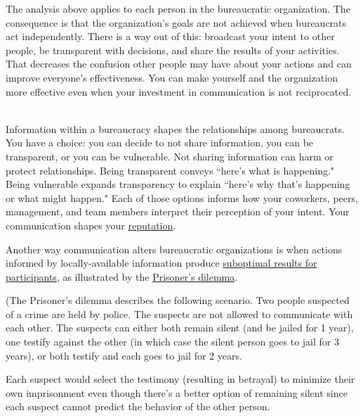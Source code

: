 The analysis above applies to each person in the bureaucratic organization.
The consequence is that the organization's goals are not achieved when bureaucrats act independently. 
There is a way out of this: broadcast your intent to other people, be transparent with decisions, and share the results of your activities. That decreases the confusion other people may have about your actions and can improve everyone's effectiveness. You can make yourself and the organization more effective even when your investment in communication is not reciprocated.

\ \\

Information within a bureaucracy shapes the relationships among bureaucrats. You have a choice: you can decide to not share information, you can be transparent, or you can be vulnerable.  
Not sharing information can harm or protect relationships. 
Being transparent conveys ``here's what is happening." Being vulnerable expands transparency to explain ``here's why that's happening or what might happen."
Each of those options informs how your coworkers, peers, management, and team members interpret their perception of your intent. Your communication shapes your \hyperref[sec:reputation]{reputation}.


Another way communication alters bureaucratic organizations is when actions informed by locally-available information produce \hyperref[sec:failure-to-comm]{suboptimal results for participants}, 
%
as illustrated by the
\href{https://en.wikipedia.org/wiki/Prisoner\%27s\_dilemma}{Prisoner's dilemma}. 

\begin{mdframed}[frametitle={Prisoner's Dilemma},frametitlerule=true,frametitlealignment=\centering]
(The Prisoner's dilemma describes the following scenario. Two people suspected of a crime are held by police. The suspects are not allowed to communicate with each other. The suspects can either both remain silent (and be jailed for 1 year), one testify against the other (in which case the silent person goes to jail for 3 years), or both testify and each goes to jail for 2 years.

Each suspect would select the testimony (resulting in betrayal) to minimize their own imprisonment even though there's a better option of remaining silent since each suspect cannot predict the behavior of the other person. 
\label{prisoners_dilemma_explanation}
\end{mdframed}

